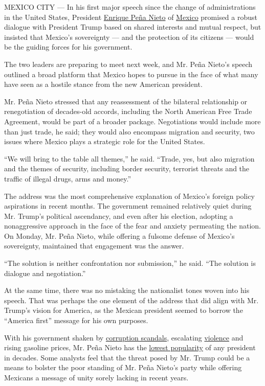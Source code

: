 MEXICO CITY --- In his first major speech since the change of
administrations in the United States, President
\href{https://www.nytimes.com/2017/01/08/world/americas/unrest-mexico-pena-nieto-gas-prices-trump.html}{Enrique
Peña Nieto} of
\href{https://www.nytimes.com/topic/destination/mexico?8qa}{Mexico}
promised a robust dialogue with President Trump based on shared
interests and mutual respect, but insisted that Mexico's sovereignty ---
and the protection of its citizens --- would be the guiding forces for
his government.

The two leaders are preparing to meet next week, and Mr. Peña Nieto's
speech outlined a broad platform that Mexico hopes to pursue in the face
of what many have seen as a hostile stance from the new American
president.

Mr. Peña Nieto stressed that any reassessment of the bilateral
relationship or renegotiation of decades-old accords, including the
North American Free Trade Agreement, would be part of a broader package.
Negotiations would include more than just trade, he said; they would
also encompass migration and security, two issues where Mexico plays a
strategic role for the United States.

``We will bring to the table all themes,'' he said. ``Trade, yes, but
also migration and the themes of security, including border security,
terrorist threats and the traffic of illegal drugs, arms and money.''

The address was the most comprehensive explanation of Mexico's foreign
policy aspirations in recent months. The government remained relatively
quiet during Mr. Trump's political ascendancy, and even after his
election, adopting a nonaggressive approach in the face of the fear and
anxiety permeating the nation. On Monday, Mr. Peña Nieto, while offering
a fulsome defense of Mexico's sovereignty, maintained that engagement
was the answer.

``The solution is neither confrontation nor submission,'' he said. ``The
solution is dialogue and negotiation.''

At the same time, there was no mistaking the nationalist tones woven
into his speech. That was perhaps the one element of the address that
did align with Mr. Trump's vision for America, as the Mexican president
seemed to borrow the ``America first'' message for his own purposes.

With his government shaken by
\href{https://www.nytimes.com/2016/10/21/world/americas/mexico\%2Dcorruption\%2Djavier\%2Dduarte.html}{corruption
scandals}, escalating
\href{https://www.nytimes.com/2016/12/13/world/americas/mexico-drug-war-violence-donald-trump-wall.html}{violence}
and rising gasoline prices, Mr. Peña Nieto has the
\href{https://www.nytimes.com/2017/01/05/world/americas/mexico\%2Dpena\%2Dnieto\%2Dtrump\%2Dturmoil\%2Dgasoline.html}{lowest
popularity} of any president in decades. Some analysts feel that the
threat posed by Mr. Trump could be a means to bolster the poor standing
of Mr. Peña Nieto's party while offering Mexicans a message of unity
sorely lacking in recent years.


